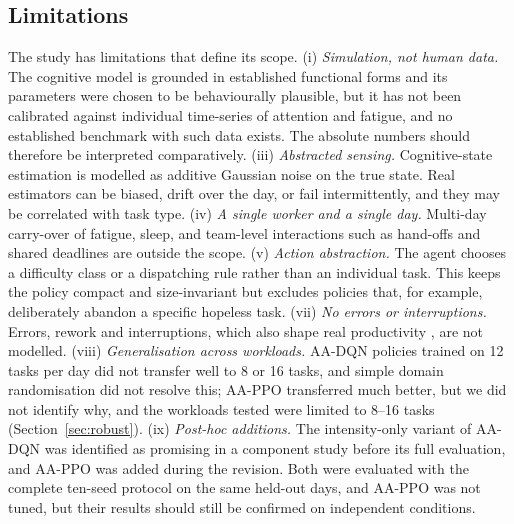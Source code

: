 \subsection{Limitations}\label{sec:limitations}
The study has limitations that define its scope. (i) \emph{Simulation, not human data.} The cognitive model is grounded in established functional forms and its parameters were chosen to be behaviourally plausible, but it has not been calibrated against individual time-series of attention and fatigue, and no established benchmark with such data exists. The absolute numbers should therefore be interpreted comparatively.   (iii) \emph{Abstracted sensing.} Cognitive-state estimation is modelled as additive Gaussian noise on the true state. Real estimators can be biased, drift over the day, or fail intermittently, and they may be correlated with task type. (iv) \emph{A single worker and a single day.} Multi-day carry-over of fatigue, sleep, and team-level interactions such as hand-offs and shared deadlines are outside the scope. (v) \emph{Action abstraction.} The agent chooses a difficulty class or a dispatching rule rather than an individual task. This keeps the policy compact and size-invariant but excludes policies that, for example, deliberately abandon a specific hopeless task.  (vii) \emph{No errors or interruptions.} Errors, rework and interruptions, which also shape real productivity \cite{mark2008,gonzalez2004,czerwinski2004}, are not modelled. (viii) \emph{Generalisation across workloads.} AA-DQN policies trained on 12 tasks per day did not transfer well to 8 or 16 tasks, and simple domain randomisation did not resolve this; AA-PPO transferred much better, but we did not identify why, and the workloads tested were limited to 8--16 tasks (Section~\ref{sec:robust}). (ix) \emph{Post-hoc additions.} The intensity-only variant of AA-DQN was identified as promising in a component study before its full evaluation, and AA-PPO was added during the revision. Both were evaluated with the complete ten-seed protocol on the same held-out days, and AA-PPO was not tuned, but their results should still be confirmed on independent conditions.

